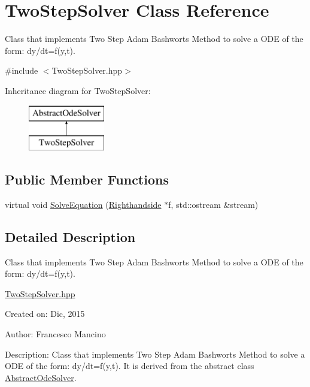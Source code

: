 \hypertarget{class_two_step_solver}{}\section{Two\+Step\+Solver Class Reference}
\label{class_two_step_solver}


Class that implements Two Step Adam Bashworts Method to solve a O\+D\+E of the form\+: dy/dt=f(y,t).  




{\ttfamily \#include $<$Two\+Step\+Solver.\+hpp$>$}

Inheritance diagram for Two\+Step\+Solver\+:\begin{figure}[H]
\begin{center}
\leavevmode
\includegraphics[height=2.000000cm]{class_two_step_solver}
\end{center}
\end{figure}
\subsection*{Public Member Functions}
\begin{DoxyCompactItemize}
\item 
virtual void \hyperlink{class_two_step_solver_ae52e8c2313e8f9fa617d13b7ed83284e}{Solve\+Equation} (\hyperlink{class_righthandside}{Righthandside} $\ast$f, std\+::ostream \&stream)
\end{DoxyCompactItemize}


\subsection{Detailed Description}
Class that implements Two Step Adam Bashworts Method to solve a O\+D\+E of the form\+: dy/dt=f(y,t). 

\hyperlink{_two_step_solver_8hpp_source}{Two\+Step\+Solver.\+hpp}

Created on\+: Dic, 2015 \begin{DoxyVerb}Author: Francesco Mancino
\end{DoxyVerb}


Description\+: Class that implements Two Step Adam Bashworts Method to solve a O\+D\+E of the form\+: dy/dt=f(y,t). It is derived from the abstract class \hyperlink{class_abstract_ode_solver}{Abstract\+Ode\+Solver}. 

